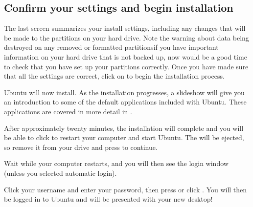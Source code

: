 \subsection{Confirm your settings and begin installation}

The last screen summarizes your install settings, including any changes that will be made to the partitions on your hard drive. Note the warning about data being destroyed on any removed or formatted partitions\dash if you have important information on your hard drive that is not backed up, now would be a good time to check that you have set up your partitions correctly.
Once you have made sure that all the settings are correct, click on  to begin the installation process.



Ubuntu will now install. As the installation progresses, a slideshow will give you an introduction to some of the default applications included with Ubuntu. These applications are covered in more detail in .



After approximately twenty minutes, the installation will complete and you will be able to click  to restart your computer and start Ubuntu. The  will be ejected, so remove it from your  drive and press  to continue.


Wait while your computer restarts, and you will then see the login window (unless you selected automatic login).


Click your username and enter your password, then press  or click . You will then be logged in to Ubuntu and will be presented with your new desktop!

